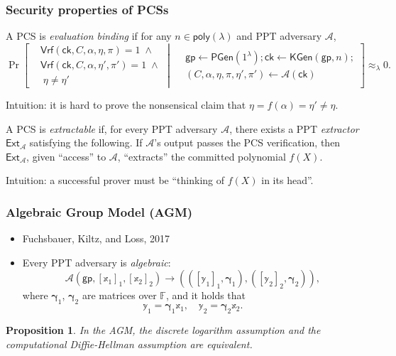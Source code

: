 \documentclass[9pt]{beamer}
\newcommand{\F}{\mathbb{F}}
\newcommand{\probability}[2]{
    \Pr
    \left[ 
    \begin{aligned}
    #1 \mspace{1mu}
    \end{aligned}
    \middle\vert
    \begin{aligned}
    \mspace{2mu} #2
    \end{aligned}
    \right]
}
\newcommand{\poly}{\mathsf{poly}}
\newcommand{\Pgen}{\mathsf{PGen}}
\newcommand{\KGen}{\mathsf{KGen}}
\newcommand{\V}{\mathsf{Vrf}}  %
\newcommand{\Ext}{\mathsf{Ext}}  %
\newcommand{\ck}{\mathsf{ck}}  %
\newcommand{\negligible}{\approx_{\lambda} 0}
\newcommand{\A}{\mathcal A}  %
\newcommand{\gp}{\mathsf{gp}}  %
\newtheorem{proposition}{Proposition}
\begin{document}
\begin{frame}
\frametitle{Security properties of PCSs}
\begin{definition}
    A PCS is \emph{evaluation binding} if for any $ n \in \poly(\lambda) $ and PPT adversary $ \A $, 
    $$
    \probability{
    & \V(\ck, C, \alpha, \eta, \pi) = 1 \; \land \\ 
    & \V(\ck, C, \alpha, \eta', \pi') = 1 \; \land \\ 
    & \; \eta \neq \eta'
    }{
    & \gp \leftarrow \Pgen(1^\lambda); \ck \leftarrow \KGen(\gp, n); \\
    & (C, \alpha, \eta, \pi, \eta', \pi') \leftarrow \A(\ck)
    }
    \negligible.
    $$
\end{definition}
Intuition: it is hard to prove the nonsensical claim that $ \eta = f(\alpha) = \eta' \neq \eta $.
\begin{definition}[informal]
    A PCS is \textit{extractable} if, for every PPT adversary $ \A $, there exists a PPT \textit{extractor} $ \Ext_{\A} $ satisfying the following. If $ \A $'s output passes the PCS verification, then $ \Ext_\A $, given ``access'' to $ \A $, ``extracts'' the committed polynomial $ f(X) $.
\end{definition}
Intuition: a successful prover must be ``thinking of $ f(X) $ in its head''.
\end{frame}


\begin{frame}
\frametitle{Algebraic Group Model (AGM)}
\begin{itemize}
    \item Fuchsbauer, Kiltz, and Loss, 2017
    \item Every PPT adversary is \textit{algebraic}:
    $$
    \A(\gp, [\mathbb x_1]_1, [\mathbb x_2]_2) \to (([\mathbb y_1]_1, \bm \gamma_1), ([\mathbb y_2]_2, \bm \gamma_2)),
    $$
    where $ \bm{\gamma}_1 $, $ \bm{\gamma}_2 $ are matrices over $ \F $, and it holds that 
    \begin{equation*}
    \mathbb y_1 = \bm{\gamma}_1 \mathbb x_1, \quad 
    \mathbb y_2 = \bm{\gamma}_2 \mathbb x_2. 
    \end{equation*}
\end{itemize}
\begin{proposition}
    In the AGM, the discrete logarithm assumption and the computational Diffie-Hellman assumption are equivalent.
\end{proposition}
\end{frame}
\end{document}
